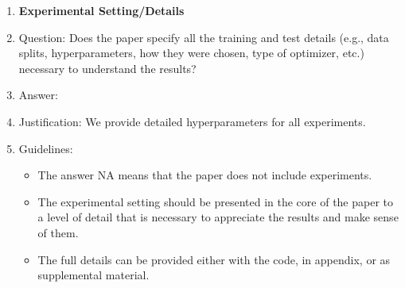 \documentclass{article} %
\begin{document}
{\begin{appendices}
\begin{enumerate}
\item {\bf Experimental Setting/Details}
    \item[] Question: Does the paper specify all the training and test details (e.g., data splits, hyperparameters, how they were chosen, type of optimizer, etc.) necessary to understand the results?
    \item[] Answer: \answerYes{} %
    \item[] Justification: We provide detailed hyperparameters for all experiments.
    \item[] Guidelines:
    \begin{itemize}
        \item The answer NA means that the paper does not include experiments.
        \item The experimental setting should be presented in the core of the paper to a level of detail that is necessary to appreciate the results and make sense of them.
        \item The full details can be provided either with the code, in appendix, or as supplemental material.
    \end{itemize}


\end{enumerate}
\end{appendices}}
\end{document}
